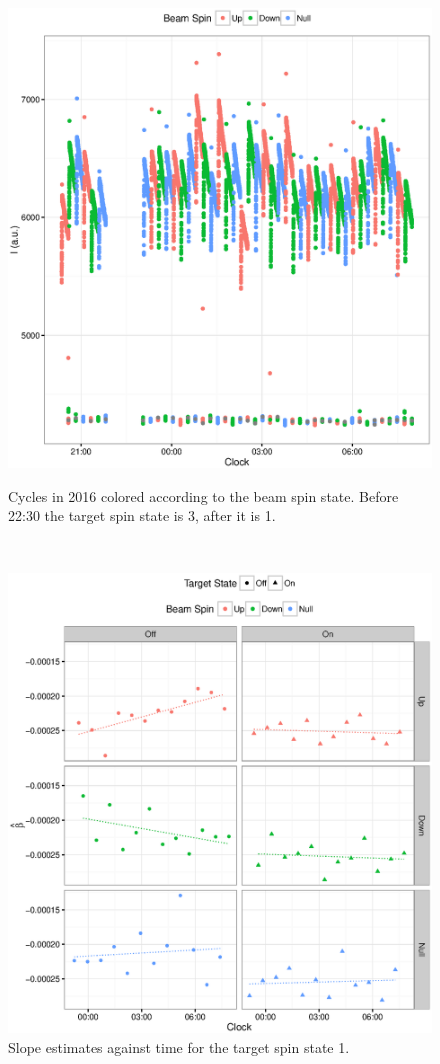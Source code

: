 \documentclass{article}
\begin{document}
\begin{figure}[h]
	\centering
	\begin{minipage}{.5\textwidth}
		\centering
		\includegraphics[scale=.5]{Cycles2016.eps}
		\caption{Cycles in 2016 colored according to the beam spin state. Before 22:30 the target spin state is 3, after it is 1.\label{fig:Cycles}}
	\end{minipage}~~
	\begin{minipage}{.5\textwidth}
		\centering
		\includegraphics[scale=.5]{Slopes2016_VS_Clock.eps}
		\caption{Slope estimates against time for the target spin state 1.\label{fig:Slopes}}
	\end{minipage}
\end{figure}	
	
\end{document}
